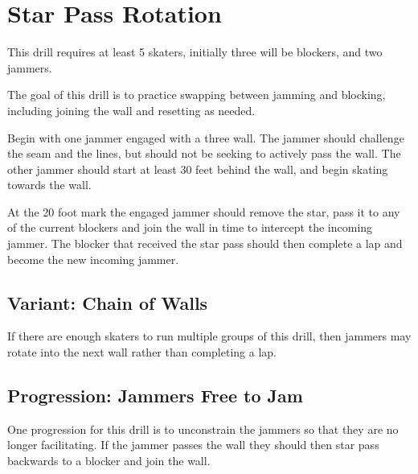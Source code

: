 \section{Star Pass Rotation}
\label{drill:star_pass/rotation}

This drill requires at least 5 skaters, initially three will be blockers, and two jammers.

The goal of this drill is to practice swapping between jamming and blocking, including joining the wall and resetting as needed. 


Begin with one jammer engaged with a three wall.
The jammer should challenge the seam and the lines, but should not be seeking to actively pass the wall.  
The other jammer should start at least 30 feet behind the wall, and begin skating towards the wall.

At the 20 foot mark the engaged jammer should remove the star, pass it to any of the current blockers and join the wall in time to intercept the incoming jammer. 
The blocker that received the star pass should then complete a lap and become the new incoming jammer.

\subsection*{Variant: Chain of Walls}
If there are enough skaters to run multiple groups of this drill, then jammers may rotate into the next wall rather than completing a lap. 


\subsection*{Progression: Jammers Free to Jam}
One progression for this drill is to unconstrain the jammers so that they are no longer facilitating.
If the jammer passes the wall they should then star pass backwards to a blocker and join the wall. 
